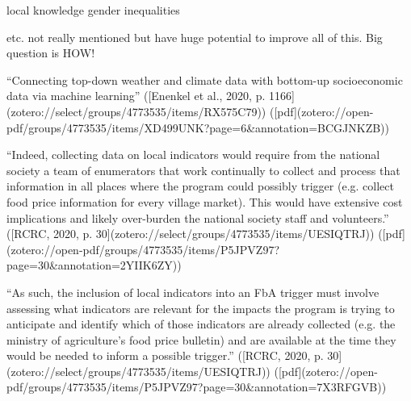 local knowledge
gender inequalities

etc. not really mentioned but have huge potential to improve all of this. Big question is HOW!

“Connecting top-down weather and climate data with bottom-up socioeconomic data via machine learning” ([Enenkel et al., 2020, p. 1166](zotero://select/groups/4773535/items/RX575C79)) ([pdf](zotero://open-pdf/groups/4773535/items/XD499UNK?page=6&annotation=BCGJNKZB))


“Indeed, collecting data on local indicators would require from the national society a team of enumerators that work continually to collect and process that information in all places where the program could possibly trigger (e.g. collect food price information for every village market). This would have extensive cost implications and likely over-burden the national society staff and volunteers.” ([RCRC, 2020, p. 30](zotero://select/groups/4773535/items/UESIQTRJ)) ([pdf](zotero://open-pdf/groups/4773535/items/P5JPVZ97?page=30&annotation=2YIIK6ZY))

“As such, the inclusion of local indicators into an FbA trigger must involve assessing what indicators are relevant for the impacts the program is trying to anticipate and identify which of those indicators are already collected (e.g. the ministry of agriculture's food price bulletin) and are available at the time they would be needed to inform a possible trigger.” ([RCRC, 2020, p. 30](zotero://select/groups/4773535/items/UESIQTRJ)) ([pdf](zotero://open-pdf/groups/4773535/items/P5JPVZ97?page=30&annotation=7X3RFGVB))


